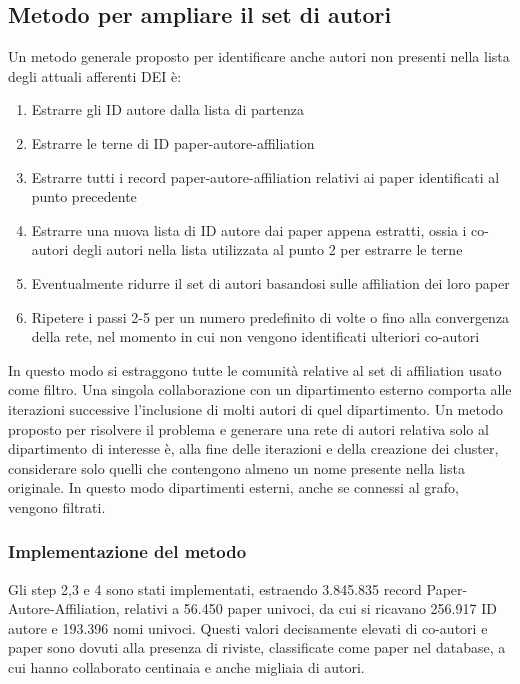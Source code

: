 \documentclass[12pt,a4paper,twoside]{report}
\begin{document}
\subsection{Metodo per ampliare il set di autori}

Un metodo generale proposto per identificare anche autori non presenti nella lista degli attuali
afferenti DEI è:

\begin{enumerate}[noitemsep, topsep=0pt]
\item
Estrarre gli ID autore dalla lista di partenza
\item
Estrarre le terne di ID paper-autore-affiliation
\item
Estrarre tutti i record paper-autore-affiliation relativi ai paper identificati al punto precedente
\item
Estrarre una nuova lista di ID autore dai paper appena estratti, ossia i co-autori degli autori nella
lista utilizzata al punto 2 per estrarre le terne
\item
Eventualmente ridurre il set di autori basandosi sulle affiliation dei loro paper
\item
Ripetere i passi 2-5 per un numero predefinito di volte o fino alla convergenza della rete, nel
momento in cui non vengono identificati ulteriori co-autori
\end{enumerate}

In questo modo si estraggono tutte le comunità relative al set di affiliation usato come filtro. Una
singola collaborazione con un dipartimento esterno comporta alle iterazioni successive l'inclusione
di molti autori di quel dipartimento. Un metodo proposto per risolvere il problema e generare una
rete di autori relativa solo al dipartimento di interesse è, alla fine delle iterazioni e della
creazione dei cluster, considerare solo quelli che contengono almeno un nome presente nella lista
originale. In questo modo dipartimenti esterni, anche se connessi al grafo, vengono filtrati.

\subsubsection{Implementazione del metodo}

Gli step 2,3 e 4 sono stati implementati, estraendo 3.845.835 record Paper-Autore-Affiliation,
relativi a 56.450 paper univoci, da cui si ricavano 256.917 ID autore e 193.396 nomi univoci. Questi
valori decisamente elevati di co-autori e paper sono dovuti alla presenza di riviste, classificate come
paper nel database, a cui hanno collaborato centinaia e anche migliaia di autori.
\end{document}
